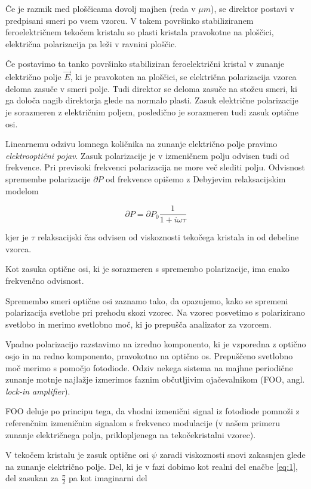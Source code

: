 \documentclass[11pt]{article}
\renewcommand{%
  \refname}{Viri}
\begin{document}
Če je razmik med ploščicama dovolj majhen (reda v \(\mu m\)), se direktor postavi v predpisani smeri po vsem vzorcu. V takem površinko stabiliziranem feroelektričnem tekočem kristalu so plasti kristala pravokotne na ploščici, električna polarizacija pa leži v ravnini ploščic.

Če postavimo ta tanko površinko stabiliziran feroelektrični kristal v zunanje električno polje \(\vec{E}\), ki je pravokoten na ploščici, se električna polarizacija vzorca deloma zasuče v smeri polje. Tudi direktor se deloma zasuče na stožcu smeri, ki ga določa nagib direktorja glede na normalo plasti. Zasuk električne polarizacije je sorazmeren z električnim poljem, posledično je sorazmeren tudi zasuk optične osi.

Linearnemu odzivu lomnega količnika na zunanje električno polje pravimo \emph{elektrooptični pojav}. Zasuk polarizacije je v izmeničnem polju odvisen tudi od frekvence. Pri previsoki frekvenci polarizacija ne more več slediti polju. Odvisnost spremembe polarizacije \(\partial P\) od frekvence opišemo z Debyjevim relaksacijskim modelom

\begin{equation}
\label{eq:1}
\partial P = \partial P_0 \frac{1}{1 + i \omega \tau}
\end{equation}

kjer je \(\tau\) relaksacijski čas odvisen od viskoznosti tekočega kristala in od debeline vzorca.

Kot zasuka optične osi, ki je sorazmeren s spremembo polarizacije, ima enako frekvenčno odvisnost.

Spremembo smeri optične osi zaznamo tako, da opazujemo, kako se spremeni polarizacija svetlobe pri prehodu skozi vzorec. Na vzorec posvetimo s polarizirano svetlobo in merimo svetlobno moč, ki jo prepušča analizator za vzorcem.

Vpadno polarizacijo razstavimo na izredno komponento, ki je vzporedna z optično osjo in na redno komponento, pravokotno na optično os. Prepuščeno svetlobno moč merimo s pomočjo fotodiode. Odziv nekega sistema na majhne periodične zunanje motnje najlažje izmerimos faznim občutljivim ojačevalnikom (FOO, angl. \emph{lock-in amplifier}).

FOO deluje po principu tega, da vhodni izmenični signal iz fotodiode pomnoži z referenčnim izmeničnim signalom s frekvenco modulacije (v našem primeru zunanje električnega polja, priklopljenega na tekočekristalni vzorec).

V tekočem kristalu je zasuk optične osi \(\psi\) zaradi viskoznosti snovi zakasnjen glede na zunanje električno polje. Del, ki je v fazi dobimo kot realni del enačbe \ref{eq:1}, del zasukan za \(\frac{\pi}{2}\) pa kot imaginarni del
\end{document}
